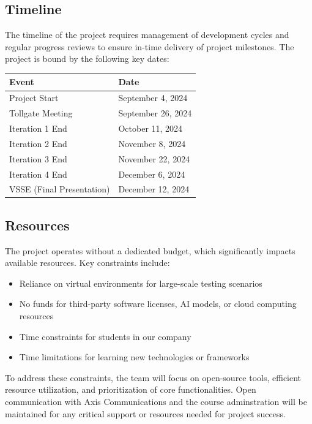 \subsection{Timeline}
The timeline of the project requires management of development cycles and regular progress reviews to ensure in-time delivery of project milestones. The project is bound by the following key dates:
    
\begin{tabular}{ll}
    \textbf{Event} & \textbf{Date} \\
    \hline
        Project Start & September 4, 2024 \\
        Tollgate Meeting & September 26, 2024 \\
        Iteration 1 End & October 11, 2024 \\
        Iteration 2 End & November 8, 2024 \\
        Iteration 3 End & November 22, 2024 \\
        Iteration 4 End & December 6, 2024 \\
        VSSE (Final Presentation) & December 12, 2024 \\
\end{tabular}

    
\subsection{Resources}
The project operates without a dedicated budget, which significantly impacts available resources. Key constraints include:
    
\begin{itemize}
    \item Reliance on virtual environments for large-scale testing scenarios
    \item No funds for third-party software licenses, AI models, or cloud computing resources
    \item Time constraints for students in our company
    \item Time limitations for learning new technologies or frameworks
\end{itemize}
    
To address these constraints, the team will focus on open-source tools, efficient resource utilization, and prioritization of core functionalities. Open communication with Axis Communications and the course adminstration will be maintained for any critical support or resources needed for project success.
    
